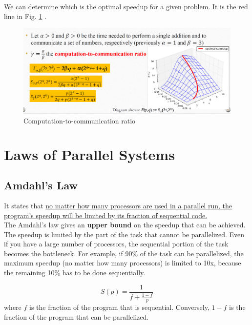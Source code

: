 We can determine which is the optimal speedup for a given problem. It is the red line in Fig. \ref{fig:06/optimal_speedup} .
\begin{figure}[htbp]
   \centering
   \includegraphics{images/06/optimal_speedup.png}
   \caption{Computation-to-communication ratio}
   \label{fig:06/optimal_speedup}
\end{figure}



\section{Laws of Parallel Systems}

\subsection{Amdahl's Law}

It states that \ul{no matter how many processors are used in a parallel run, the program's speedup will be limited by its fraction of sequential code.}\\
The Amdahl’s law gives an \textbf{upper bound} on the speedup that can be achieved.
The speedup is limited by the part of the task that cannot be parallelized. Even if you have a large number of processors, the sequential portion of the task becomes the bottleneck.
For example, if 90\% of the task can be parallelized, the maximum speedup (no matter how many processors) is limited to 10x, because the remaining 10\% has to be done sequentially.

\begin{definition}
   \begin{equation}
      S(p) = \frac{1}{f + \frac{1-f}{p}}
   \end{equation}
   where $f$ is the fraction of the program that is sequential. Conversely, $1-f$ is the fraction of the program that can be parallelized.
\end{definition}

